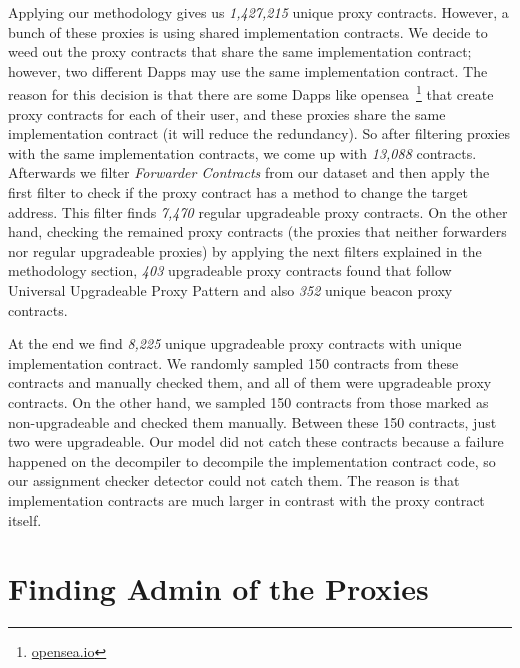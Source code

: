 
Applying our methodology gives us \textit{1,427,215} unique proxy contracts. However, a bunch of these proxies is using shared implementation contracts. We decide to weed out the proxy contracts that share the same implementation contract; however, two different Dapps may use the same implementation contract. The reason for this decision is that there are some Dapps like opensea~\footnote{\url{opensea.io}} that create proxy contracts for each of their user, and these proxies share the same implementation contract (it will reduce the redundancy). So after filtering proxies with the same implementation contracts, we come up with \textit{13,088} contracts.
Afterwards we filter \textit{Forwarder Contracts} from our dataset and then apply the first filter to check if the proxy contract has a method to change the target address. This filter finds \textit{7,470} regular upgradeable proxy contracts.
On the other hand, checking the remained proxy contracts (the proxies that neither forwarders nor regular upgradeable proxies) by applying the next filters explained in the methodology section, \textit{403} upgradeable proxy contracts found that follow Universal Upgradeable Proxy Pattern and also \textit{352} unique beacon proxy contracts.

At the end we find \textit{8,225} unique upgradeable proxy contracts with unique implementation contract. We randomly sampled 150 contracts from these contracts and manually checked them, and all of them were upgradeable proxy contracts. On the other hand, we sampled 150 contracts from those marked as non-upgradeable and checked them manually. Between these 150 contracts, just two were upgradeable. Our model did not catch these contracts because a failure happened on the decompiler to decompile the implementation contract code, so our assignment checker detector could not catch them. The reason is that implementation contracts are much larger in contrast with the proxy contract itself.


\section{Finding Admin of the Proxies}
\label{sec:governance}


